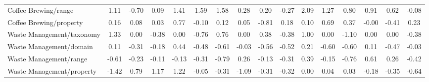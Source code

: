 \begin{tabular}{lccccccccccccccc}
Coffee Brewing/range & 1.11 & -0.70 & 0.09 & 1.41 & 1.59 & 1.58 & 0.28 & 0.20 & -0.27 & 2.09 & 1.27 & 0.80 & 0.91 & 0.62 & -0.08 \\
Coffee Brewing/property & 0.16 & 0.08 & 0.03 & 0.77 & -0.10 & 0.12 & 0.05 & -0.81 & 0.18 & 0.10 & 0.69 & 0.37 & -0.00 & -0.41 & 0.23 \\
Waste Management/taxonomy & 1.33 & 0.00 & -0.38 & 0.00 & -0.76 & 0.76 & 0.00 & 0.38 & -0.38 & 1.00 & 0.00 & -1.10 & 0.00 & 0.00 & -0.38 \\
Waste Management/domain & 0.11 & -0.31 & -0.18 & 0.44 & -0.48 & -0.61 & -0.03 & -0.56 & -0.52 & 0.21 & -0.60 & -0.60 & 0.11 & -0.47 & -0.03 \\
Waste Management/range & -0.61 & -0.23 & -0.11 & -0.13 & -0.31 & -0.79 & 0.26 & -0.13 & -0.31 & 0.39 & -0.15 & -0.76 & 0.61 & 0.26 & -0.42 \\
Waste Management/property & -1.42 & 0.79 & 1.17 & 1.22 & -0.05 & -0.31 & -1.09 & -0.31 & -0.32 & 0.00 & 0.04 & 0.03 & -0.18 & -0.35 & -0.64 \\
\bottomrule
\end{tabular}
